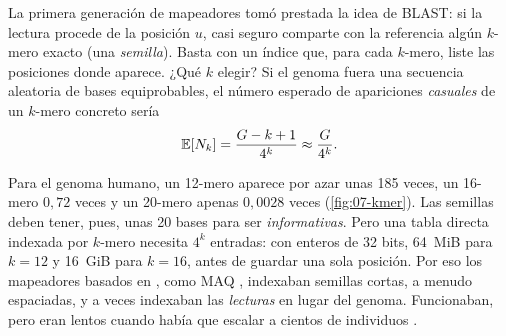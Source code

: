 La primera generación de mapeadores tomó prestada la idea de BLAST: si la lectura procede de la posición $u$, casi seguro comparte con la referencia algún $k$-mero exacto (una \emph{semilla}). Basta con un índice que, para cada $k$-mero, liste las posiciones donde aparece. ¿Qué $k$ elegir? Si el genoma fuera una secuencia aleatoria de bases equiprobables, el número esperado de apariciones \emph{casuales} de un $k$-mero concreto sería
\begin{equation}\label{eq:07-kmer}
\mathbb{E}[N_k] = \frac{G-k+1}{4^{k}} \approx \frac{G}{4^{k}}.
\end{equation}

\begin{simbolos}
\end{simbolos}

Para el genoma humano, un 12-mero aparece por azar unas 185 veces, un 16-mero $0{,}72$ veces y un 20-mero apenas $0{,}0028$ veces (\cref{fig:07-kmer}). Las semillas deben tener, pues, unas 20 bases para ser \emph{informativas}. Pero una tabla directa indexada por $k$-mero necesita $4^k$ entradas: con enteros de 32 bits, 64~MiB para $k=12$ y 16~GiB para $k=16$, antes de guardar una sola posición. Por eso los mapeadores basados en , como MAQ \parencite{c07-li2008maq}, indexaban semillas cortas, a menudo espaciadas, y a veces indexaban las \emph{lecturas} en lugar del genoma. Funcionaban, pero eran lentos cuando había que escalar a cientos de individuos \parencite{c07-li2009bwa}.

